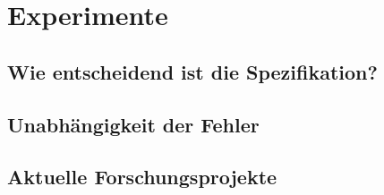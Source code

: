 \section{Experimente}
\subsection{Wie entscheidend ist die Spezifikation?}
\subsection{Unabhängigkeit der Fehler}
\subsection{Aktuelle Forschungsprojekte}